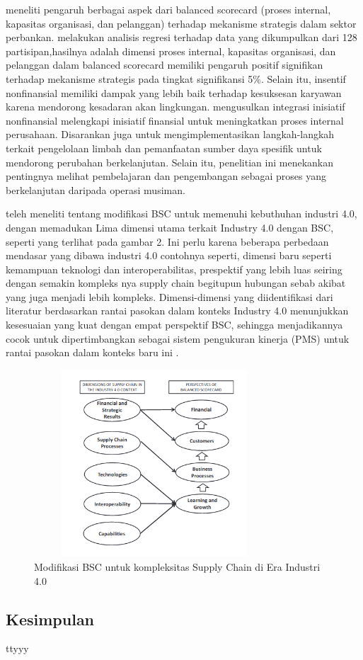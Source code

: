 \documentclass{article}
\begin{document}
\cite{Ali2021TheBS} meneliti pengaruh berbagai aspek dari balanced scorecard (proses internal, kapasitas organisasi, dan pelanggan) terhadap mekanisme strategis dalam sektor perbankan. \cite{Ali2021TheBS} melakukan analisis regresi terhadap data yang dikumpulkan dari 128 partisipan,hasilnya adalah dimensi proses internal, kapasitas organisasi, dan pelanggan dalam balanced scorecard memiliki pengaruh positif signifikan terhadap mekanisme strategis pada tingkat signifikansi 5\%. Selain itu, insentif nonfinansial memiliki dampak yang lebih baik terhadap kesuksesan karyawan karena mendorong kesadaran akan lingkungan. \cite{Ali2021TheBS} mengusulkan integrasi inisiatif nonfinansial melengkapi inisiatif finansial untuk meningkatkan proses internal perusahaan. Disarankan juga untuk mengimplementasikan langkah-langkah terkait pengelolaan limbah dan pemanfaatan sumber daya spesifik untuk mendorong perubahan berkelanjutan. Selain itu, penelitian ini menekankan pentingnya melihat pembelajaran dan pengembangan sebagai proses yang berkelanjutan daripada operasi musiman.

\cite{Frederico2020PerformanceMF} teleh meneliti tentang modifikasi BSC untuk memenuhi kebuthuhan industri 4.0, dengan memadukan Lima dimensi utama terkait Industry 4.0 dengan BSC, seperti yang terlihat pada gambar 2. Ini perlu karena  beberapa perbedaan mendasar yang dibawa industri 4.0 contohnya seperti, dimensi baru seperti kemampuan teknologi dan interoperabilitas, prespektif yang lebih luas seiring dengan semakin kompleks nya supply chain begitupun  hubungan sebab akibat yang juga menjadi lebih kompleks.  Dimensi-dimensi yang diidentifikasi dari literatur berdasarkan rantai pasokan dalam konteks Industry 4.0 menunjukkan kesesuaian yang kuat dengan empat perspektif BSC, sehingga menjadikannya cocok untuk dipertimbangkan sebagai sistem pengukuran kinerja (PMS) untuk rantai pasokan dalam konteks baru ini \cite{Frederico2020PerformanceMF}.



\begin{figure}[htbp]
    \centering
    \includegraphics[width=0.8\textwidth,height=7cm]{Industry-4}
    \caption{Modifikasi BSC untuk kompleksitas Supply Chain di Era Industri 4.0}
\end{figure}


\subsection*{Kesimpulan}
ttyyy



\end{document}
